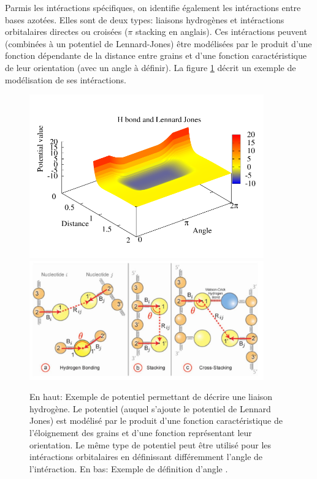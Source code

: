 \documentclass[a4paper,11pt]{article}
\begin{document}
Parmis les intéractions spécifiques, on identifie également les intéractions entre bases azotées. Elles sont de deux types: liaisons hydrogènes et intéractions orbitalaires directes ou croisées ($\pi$ stacking en anglais). Ces intéractions peuvent (combinées à un potentiel de Lennard-Jones) être modélisées par le produit d'une fonction dépendante de la distance entre grains et d'une fonction caractéristique de leur orientation (avec un angle à définir). La figure \ref{hbonds} décrit un exemple de modélisation de ses intéractions.


\begin{figure}[H]
\begin{center}
\includegraphics[width=0.9\textwidth]{bbhbonds.pdf}
\includegraphics[width=0.9\textwidth]{specinterac.jpg}

\caption{En haut: Exemple de potentiel permettant de décrire une liaison hydrogène. Le potentiel (auquel s'ajoute le potentiel de Lennard Jones) est modélisé par le produit d'une fonction caractéristique de l'éloignement des grains et d'une fonction représentant leur orientation. Le même type de potentiel peut être utilisé pour les intéractions orbitalaires en définissant différemment l'angle de l'intéraction. En bas: Exemple de définition d'angle \cite{jchem}.}
\label{hbonds}
\end{center}
\end{figure}
\end{document}
